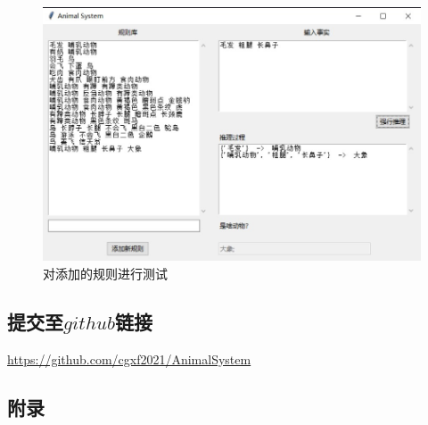 \documentclass[a4paper]{article}   %
\begin{document}
 	\begin{figure}[!htbp]
 		\centering
 		\includegraphics[scale=0.75]{./resource/show3.jpg}
 		\caption{对添加的规则进行测试}
 	\end{figure}
 	\subsection*{提交至$ github $链接}
 	\noindent
 	\href{https://github.com/cgxf2021/AnimalSystem}{https://github.com/cgxf2021/AnimalSystem} 
 	\subsection*{附录}
 	
 	
 	
\end{document}
